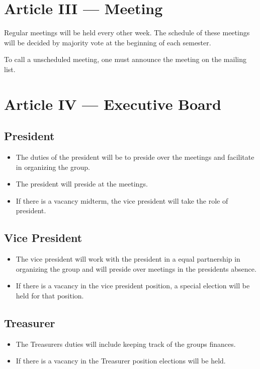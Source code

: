 \documentclass{article}
\begin{document}
\section{Article III --- Meeting}

Regular meetings will be held every other week. The schedule of these
meetings will be decided by majority vote at the beginning of each
semester.

To call a unscheduled meeting, one must announce the meeting on the
mailing list.

\section{Article IV --- Executive
Board}

\subsection{President}

\begin{itemize}
	\item
		The duties of the president will be to preside over the meetings and
		facilitate in organizing the group.
	\item
		The president will preside at the meetings.
	\item
		If there is a vacancy midterm, the vice president will take the role
		of president.
\end{itemize}

\subsection{Vice President}

\begin{itemize}
	\item
		The vice president will work with the president in a equal partnership
		in organizing the group and will preside over meetings in the
		presidents absence.
	\item
		If there is a vacancy in the vice president position, a special
		election will be held for that position.
\end{itemize}

\subsection{Treasurer}

\begin{itemize}
	\item
		The Treasurers duties will include keeping track of the groups
		finances.
	\item
		If there is a vacancy in the Treasurer position elections will be
		held.
\end{itemize}
\end{document}
